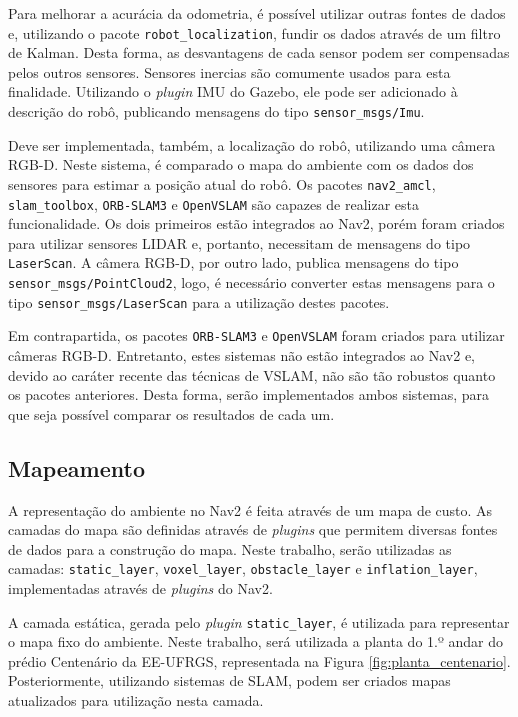 \documentclass[repeatfields,xlists,xpacks,oneside,yearsonly]{ufrgscca}
\begin{document}
Para melhorar a acurácia da odometria, é possível utilizar outras fontes de
dados e, utilizando o pacote \texttt{robot\_localization}, fundir os dados
através de um filtro de Kalman.
Desta forma, as desvantagens de cada sensor podem ser compensadas pelos outros
sensores.
Sensores inercias são comumente usados para esta finalidade.
Utilizando o \textit{plugin} IMU do Gazebo, ele pode ser adicionado à descrição
do robô, publicando mensagens do tipo \texttt{sensor\_msgs/Imu}.


Deve ser implementada, também, a localização do robô, utilizando uma câmera RGB-D.
Neste sistema, é comparado o mapa do ambiente com os dados dos sensores para estimar
a posição atual do robô.
Os pacotes \texttt{nav2\_amcl}, \texttt{slam\_toolbox}, \texttt{ORB-SLAM3}
e \texttt{OpenVSLAM} são capazes de realizar esta funcionalidade.
Os dois primeiros estão integrados ao Nav2,
porém foram criados para utilizar sensores LIDAR e, portanto,
necessitam de mensagens do tipo \texttt{LaserScan}.
A câmera RGB-D, por outro lado, publica mensagens do tipo \texttt{sensor\_msgs/PointCloud2},
logo, é necessário converter estas mensagens para o tipo \texttt{sensor\_msgs/LaserScan}
para a utilização destes pacotes.

Em contrapartida, os pacotes \texttt{ORB-SLAM3} e \texttt{OpenVSLAM} foram
criados para utilizar câmeras RGB-D. Entretanto, estes sistemas não estão
integrados ao Nav2 e, devido ao caráter recente das técnicas de
VSLAM, não são tão robustos quanto os pacotes anteriores.
Desta forma, serão implementados ambos sistemas, para que seja possível
comparar os resultados de cada um.

\subsection{Mapeamento}

A representação do ambiente no Nav2 é feita através de um mapa de custo.
As camadas do mapa são definidas através de \textit{plugins} que permitem
diversas fontes de dados para a construção do mapa.
Neste trabalho, serão utilizadas as camadas: \texttt{static\_layer},
\texttt{voxel\_layer}, \texttt{obstacle\_layer} e \texttt{inflation\_layer},
implementadas através de \textit{plugins} do Nav2.

A camada estática, gerada pelo \textit{plugin} \texttt{static\_layer},
é utilizada para representar o mapa fixo do ambiente.
Neste trabalho, será utilizada a planta do 1.º andar do prédio Centenário da EE-UFRGS,
representada na Figura \ref{fig:planta_centenario}.
Posteriormente, utilizando sistemas de SLAM, podem ser criados mapas atualizados
para utilização nesta camada.
\end{document}
